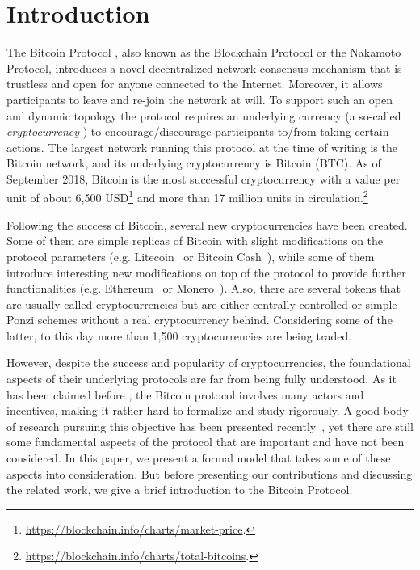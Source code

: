 
\section{Introduction}

The Bitcoin Protocol \cite{Bitcoin,DBLP:books/daglib/0040621,NC17}, also known as the Blockchain Protocol or the Nakamoto Protocol, introduces a novel decentralized network-consensus mechanism that is trustless 
and open for anyone connected to the Internet. Moreover, it allows participants to leave and re-join the network at will. To support such an open and dynamic topology the protocol requires an underlying currency (a so-called \emph{cryptocurrency} \cite{NC17}) to encourage/discourage participants to/from taking certain actions. The largest network running this protocol at the time of writing is the Bitcoin network, and its underlying cryptocurrency is Bitcoin (BTC). As of September 2018, Bitcoin is the most successful cryptocurrency with a value per unit of about 6,500 USD\footnote{\url{https://blockchain.info/charts/market-price}.}
and more than 17 million units in circulation.\footnote{\url{https://blockchain.info/charts/total-bitcoins}.}
 
Following the success of Bitcoin, several new cryptocurrencies have been created. Some of them are simple replicas of Bitcoin with slight modifications on the protocol parameters (e.g. Litecoin~\cite{Litecoin} or Bitcoin Cash~\cite{Bcash}), while some of them introduce interesting new modifications on top of the protocol to provide further functionalities (e.g. Ethereum~\cite{Ethereum,E17} or Monero~\cite{Monero}). Also, there are several tokens that are usually called cryptocurrencies but are either centrally controlled or simple Ponzi schemes without a real cryptocurrency behind.
Considering some of the latter, to this day more than 1,500 cryptocurrencies are being traded.

However, despite the success and popularity of cryptocurrencies, the foundational aspects of their underlying protocols are far from being fully understood. As it has been claimed before \cite{mininggames:2016}, the Bitcoin protocol involves many actors and incentives, making it rather hard to formalize and study rigorously. A good body of research pursuing this objective has been presented recently~\cite{mininggames:2016,optimalselfishmining2017,instabilitywithoutreward:2016,selfishmining2014,stop_selfish_mining2014,eclipseattacks2015,LBSZR15,LJG15,stubborn_mining:2016,economics_of_mining2013,ZGR17,ABLZ17,MHG18,SZWTK18}, 
yet there are still some fundamental aspects of the protocol that are important and have not been considered. 
In this paper, we present a formal model that takes some of these aspects into consideration. But before presenting our contributions and discussing the related work, we give a brief introduction to the Bitcoin Protocol.

